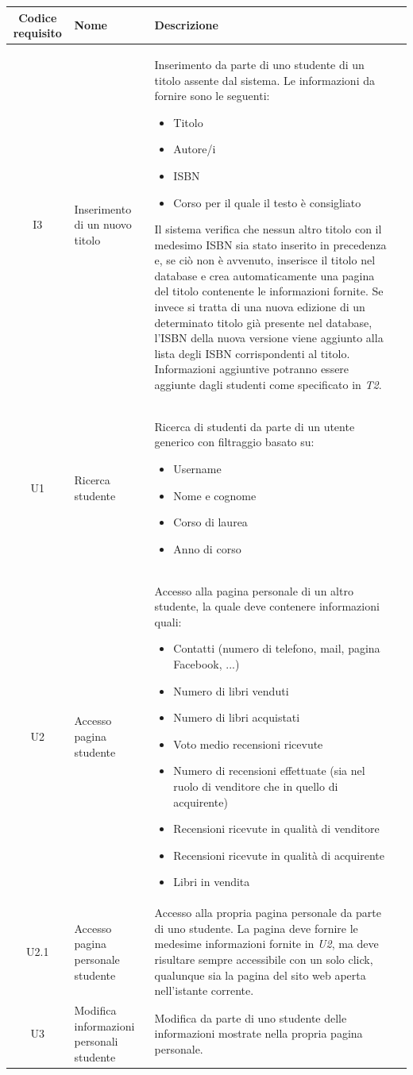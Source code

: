 \documentclass[10pt,a4paper]{report}
\begin{document}
	\begin{tabular}{cp{3cm}p{9cm}p{1cm}}
		Codice requisito&Nome&Descrizione\\ \hline
		I3&Inserimento di un nuovo titolo&Inserimento da parte di uno studente di un titolo assente dal sistema. Le informazioni da fornire sono le seguenti:
		\begin{itemize}
			\item Titolo
			\item Autore/i
			\item ISBN
			\item Corso per il quale il testo è consigliato
		\end{itemize}
		Il sistema verifica che nessun altro titolo con il medesimo ISBN sia stato inserito in precedenza e, se ciò non è avvenuto, inserisce il titolo nel database e crea automaticamente una pagina del titolo contenente le informazioni fornite. Se invece si tratta di una nuova edizione di un determinato titolo già presente nel database, l'ISBN della nuova versione viene aggiunto alla lista degli ISBN corrispondenti al titolo. Informazioni aggiuntive potranno essere aggiunte dagli studenti come specificato in \textit{T2}.\\ \hline
		U1&Ricerca studente&Ricerca di studenti da parte di un utente generico con filtraggio basato su:
		\begin{itemize}
			\item Username
			\item Nome e cognome
			\item Corso di laurea
			\item Anno di corso
		\end{itemize}\\ \hline
		U2&Accesso pagina studente&Accesso alla pagina personale di un altro studente, la quale deve contenere informazioni quali:
		\begin{itemize}
			\item Contatti (numero di telefono, mail, pagina Facebook, ...)
			\item Numero di libri venduti
			\item Numero di libri acquistati
			\item Voto medio recensioni ricevute
			\item Numero di recensioni effettuate (sia nel ruolo di venditore che in quello di acquirente)
			\item Recensioni ricevute in qualità di venditore
			\item Recensioni ricevute in qualità di acquirente
			\item Libri in vendita
		\end{itemize}\\ \hline
		U2.1&Accesso pagina personale studente&Accesso alla propria pagina personale da parte di uno studente. La pagina deve fornire le medesime informazioni fornite in \textit{U2}, ma deve risultare sempre accessibile con un solo click, qualunque sia la pagina del sito web aperta nell'istante corrente.\\ \hline
		U3&Modifica informazioni personali studente&Modifica da parte di uno studente delle informazioni mostrate nella propria pagina personale.\\ \hline
	\end{tabular}
\end{document}

